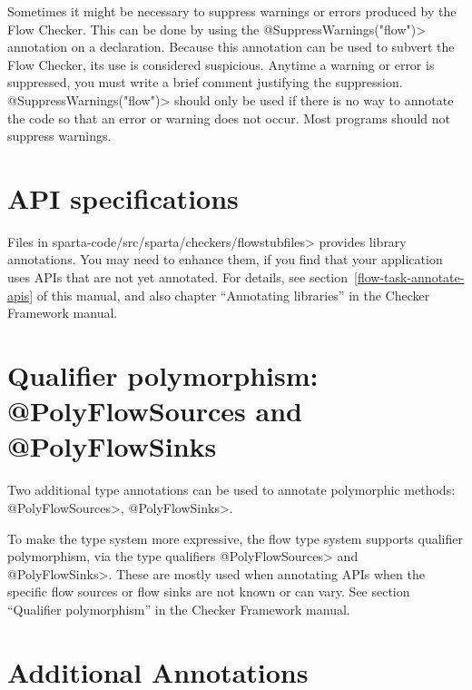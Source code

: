  Sometimes it might be necessary to suppress warnings or errors produced by the
  Flow Checker.  This can be done by using the  \<@SuppressWarnings("flow")> annotation
   on a declaration.  Because this annotation can be used to subvert the Flow Checker, its use
   is considered suspicious.  Anytime a warning or error is suppressed, you must 
   write a brief comment justifying the suppression.     \<@SuppressWarnings("flow")> should
   only be used if there is no way to annotate the code so that an error or warning does not occur. 
   Most programs should not suppress warnings. 


\section{API specifications\label{sec:apispecs}}

Files in  \<sparta-code/src/sparta/checkers/flowstubfiles> provides library
annotations.  You may need to enhance them, if you find that your application
uses APIs that are not yet annotated.  For details, see
section~\ref{flow-task-annotate-apis} of this manual, and also 
chapter
``Annotating libraries'' in the Checker Framework manual.


\section{Qualifier polymorphism: @PolyFlowSources  and @PolyFlowSinks \label{sec:polyflowsources}}

Two additional type annotations can be used to annotate polymorphic
methods: \<@PolyFlowSources>, \<@PolyFlowSinks>.

To make the type system more expressive, the flow type system supports
qualifier polymorphism, via the type qualifiers \<@PolyFlowSources> and
\<@PolyFlowSinks>.  These are mostly used when annotating APIs when the
specific flow sources or flow sinks are not known or can vary. 
See section ``Qualifier polymorphism'' in the Checker Framework manual.  




\section{Additional Annotations\label{sec:addtionalanno}}

